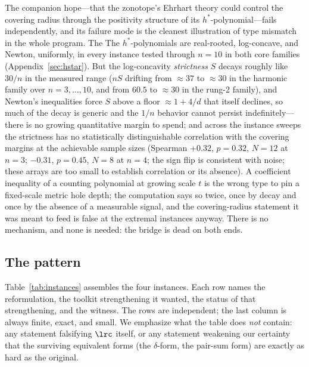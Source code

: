 The companion hope---that the zonotope's Ehrhart theory could control
the covering radius through the positivity structure of its
$h^*$-polynomial---fails independently, and its failure mode is the
cleanest illustration of type mismatch in the whole program. The
The $h^*$-polynomials are real-rooted, log-concave, and Newton, uniformly,
in every instance tested through $n=10$ in both core families
(Appendix~\ref{sec:hstar}). But the log-concavity \emph{strictness} $S$
decays roughly like $30/n$ in the measured range ($nS$ drifting from
$\approx37$ to $\approx30$ in the harmonic family over
$n=3,\dots,10$, and from $60.5$ to $\approx30$ in the rung-2 family),
and Newton's inequalities force $S$ above a floor $\approx1+4/d$ that
itself declines, so much of the decay is generic and the $1/n$ behavior
cannot persist indefinitely---there is no growing quantitative margin to
spend; and across the instance sweeps the strictness has no
statistically distinguishable correlation with the covering margins at
the achievable sample sizes (Spearman $+0.32$, $p=0.32$, $N=12$ at
$n=3$; $-0.31$, $p=0.45$, $N=8$ at $n=4$; the sign flip is consistent
with noise; these arrays are too small to establish correlation or its
absence). A
coefficient inequality of a counting polynomial at growing scale $t$ is
the wrong type to pin a fixed-scale metric hole depth; the computation
says so twice, once by decay and once by the absence of a measurable
signal, and the covering-radius statement it was meant to feed is false
at the extremal instances anyway. There is no mechanism, and none is
needed: the bridge is dead on both ends.

\subsection{The pattern}

Table~\ref{tab:instances} assembles the four instances. Each row names
the reformulation, the toolkit strengthening it wanted, the status of
that strengthening, and the witness. The rows are independent; the last
column is always finite, exact, and small. We emphasize what the table
does \emph{not} contain: any statement falsifying $\lrc$ itself, or any
statement weakening our certainty that the surviving equivalent forms
(the $\delta$-form, the pair-sum form) are exactly as hard as the
original.

